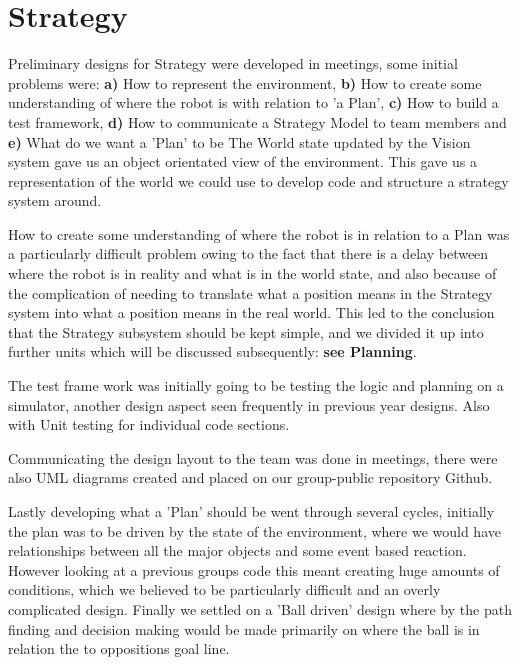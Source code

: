 \section{Strategy}


Preliminary designs for Strategy were developed in meetings, some initial 
problems were:\newline
{\bf a)} How to represent the environment, {\bf b)} How to create some 
understanding of where the robot is with relation to 'a Plan', 
{\bf c)} How to build a test framework, {\bf d)} How to communicate a 
Strategy Model to team members and {\bf e)} What do we want a 'Plan' to be
\newline
The World state updated by the Vision system gave us an object orientated view
of the environment. This gave us a representation of the world we could use
to develop code and structure a strategy system around.

How to create some understanding of where the robot is in relation to a Plan
was a particularly difficult problem owing to the fact that there is a delay 
between where the robot is in reality and what is in the world state, and also 
because of the complication of needing to translate what a position means in the 
Strategy system into what a position means in the real world. This led to the 
conclusion that the Strategy subsystem should be kept simple, and we divided it 
up into further units which will be discussed subsequently: {\bf see Planning}.

The test frame work was initially going to be testing the logic and planning 
on a simulator, another design aspect seen frequently in previous year designs.
Also with Unit testing for individual code sections.

Communicating the design layout to the team was done in meetings, there were 
also UML diagrams created and placed on our group-public repository Github.

Lastly developing what a 'Plan' should be went through several cycles, initially
the plan was to be driven by the state of the environment, where we would have 
relationships between all the major objects and some event based reaction. 
However looking at a previous groups code this meant creating huge amounts of
conditions, which we believed to be particularly difficult and an overly 
complicated design. Finally we settled on a 'Ball driven' design where by the 
path finding and decision making would be made primarily on where the ball is
in relation the to oppositions goal line.

